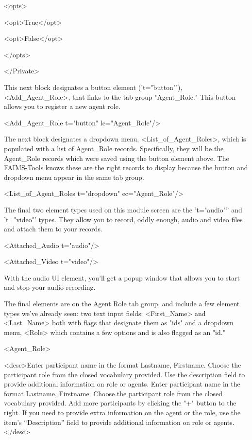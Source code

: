 <opts>

<opt>True</opt>

<opt>False</opt>

</opts>

</Private>

This next block designates a button element ('t="button"'), <Add_Agent_Role>, that links to the tab group "Agent_Role." This button allows you to register a new agent role.

<Add_Agent_Role t="button" lc="Agent_Role"/>

The next block designates a dropdown menu, <List_of_Agent_Roles>, which is populated with a list of Agent_Role records. Specifically, they will be the Agent_Role records which were saved using the button element above. The FAIMS-Tools knows these are the right records to display because the button and dropdown menu appear in the same tab group.

<List_of_Agent_Roles t="dropdown" ec="Agent_Role"/>

The final two element types used on this module screen are the 't="audio"'' and 't="video"' types. They allow you to record, oddly enough, audio and video files and attach them to your records.

<Attached_Audio t="audio"/>

<Attached_Video t="video"/>

{}

With the audio UI element, you'll get a popup window that allows you to start and stop your audio recording.

The final elements are on the Agent Role tab group, and include a few element types we've already seen: two text input fields: <First_Name> and <Last_Name> both with flags that designate them as "ids" and a dropdown menu, <Role> which contains a few options and is also flagged as an "id."

{}

<Agent_Role>

<desc>Enter participant name in the format Lastname, Firstname. Choose the participant role from the closed vocabulary provided. Use the description field to provide additional information on role or agents. Enter participant name in the format Lastname, Firstname. Choose the participant role from the closed vocabulary provided. Add more participants by clicking the "+" button to the right. If you need to provide extra information on the agent or the role, use the item's “Description” field to provide additional information on role or agents.</desc>

